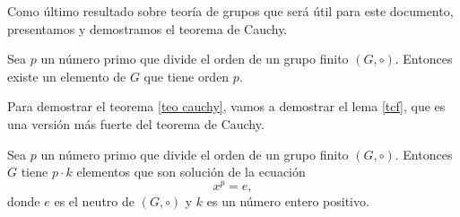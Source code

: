 Como último resultado sobre teoría de grupos que será útil para este
documento, presentamos y demostramos el teorema de Cauchy.
\begin{theorem}[{\bf Cauchy}]\label{teo cauchy}
Sea $p$ un número primo que divide el orden de un grupo finito
$(G,\circ)$. Entonces existe un elemento de $G$ que tiene orden $p$.
\end{theorem}
Para demostrar el teorema \ref{teo cauchy}, vamos a demostrar el lema \ref{tcf}, que es una versión más fuerte del teorema de Cauchy.
\begin{lemma}\label{tcf}
Sea $p$ un número primo que divide el orden de un grupo finito
$(G, \circ)$. Entonces $G$ tiene $p\cdot k$ elementos que son solución
de la ecuación $$x^p=e,$$ donde $e$ es el neutro de $(G, \circ)$ y $k$
es un número entero positivo.
\end{lemma}
